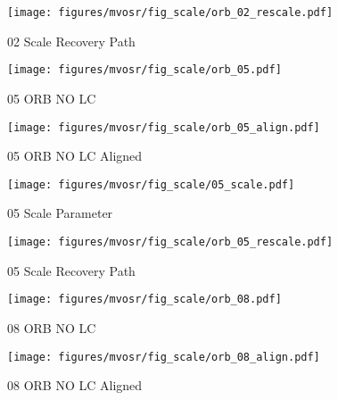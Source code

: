 \begin{figure*}[t]
\begin{subfigure}[b]{0.23\textwidth}
                \label{fig:scale_02}
                \vspace*{1mm}
                \end{subfigure}
                \begin{subfigure}[b]{0.23\textwidth}
                    \texttt{[image: figures/mvosr/fig\_scale/orb\_02\_rescale.pdf]}
                    \caption{02 Scale Recovery Path}
                    \label{fig:scaled_path_02}
                    \vspace*{1mm}
                    \vspace*{1mm}
                    \end{subfigure}
    \begin{subfigure}[b]{0.23\textwidth}
    \texttt{[image: figures/mvosr/fig\_scale/orb\_05.pdf]}
    \label{fig:orb_path_05}
    \caption{ 05 ORB NO LC}
    \vspace*{1mm}
    \end{subfigure}
    \begin{subfigure}[b]{0.23\textwidth}
        \texttt{[image: figures/mvosr/fig\_scale/orb\_05\_align.pdf]}
        \label{fig:orb_path_05_175}
        \caption{05 ORB NO LC Aligned}
        \end{subfigure}
        \begin{subfigure}[b]{0.23\textwidth}
            \texttt{[image: figures/mvosr/fig\_scale/05\_scale.pdf]}
            \label{fig:scale_05}
            \caption{05 Scale Parameter}
            \end{subfigure}
            \begin{subfigure}[b]{0.23\textwidth}
                \texttt{[image: figures/mvosr/fig\_scale/orb\_05\_rescale.pdf]}
                \label{fig:scaled_path_05}
                \caption{05 Scale Recovery Path}
                \vspace*{1mm}
                \end{subfigure}   
    \begin{subfigure}[b]{0.23\textwidth}
        \texttt{[image: figures/mvosr/fig\_scale/orb\_08.pdf]}
        \label{fig:orb_path_08}
        \caption{08 ORB NO LC}
        \end{subfigure}
        \begin{subfigure}[b]{0.23\textwidth}
            \texttt{[image: figures/mvosr/fig\_scale/orb\_08\_align.pdf]}
            \label{fig:orb_path_08_25}
            \caption{08 ORB NO LC Aligned}

\end{subfigure}
\end{figure*}
